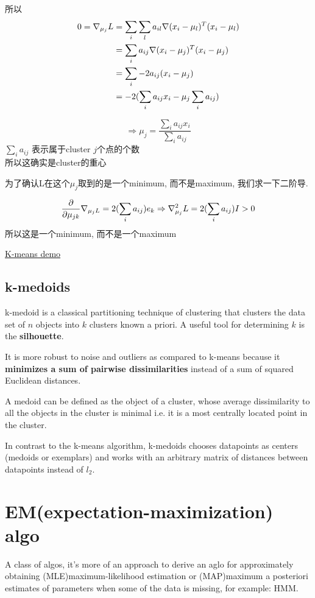 \documentclass{article}
\begin{document}
所以
$$
\begin{aligned}
0 = \nabla _{\mu_j}{L}
&= \sum_i \sum_l a_{il} \nabla (x_i - \mu_l)^T (x_i - \mu_l) \\
&= \sum_i a_{ij} \nabla (x_i - \mu_j)^T (x_i - \mu_j) \\
&= \sum_i -2a_{ij} (x_i - \mu_j) \\
&= -2(\sum_i a_{ij}x_i - \mu_j \sum_i a_{ij})
\end{aligned}
$$

$$
\Rightarrow
\mu_j = \dfrac{\sum_i a_{ij}x_i}{\sum_i a_{ij}}
$$
$\sum_i a_{ij}$  表示属于cluster $j$个点的个数\\
所以这确实是cluster的重心

为了确认L在这个$\mu_j$取到的是一个minimum, 而不是maximum, 我们求一下二阶导.

$$
\frac{\partial }{\partial \mu_{jk}} \nabla _{\mu_{j} L}
= 2(\sum_i a_{ij}) e_k
\Rightarrow
\nabla ^2_{\mu_j} L = 2(\sum_i a_{ij})I > 0
$$
所以这是一个minimum, 而不是一个maximum

\href{https://www.youtube.com/watch?v=zHbxbb2ye3E}{K-means demo}

\subsection{k-medoids}
k-medoid is a classical partitioning technique of clustering that clusters the data set of $n$ objects into $k$ clusters known a priori. 
A useful tool for determining $k$ is the \textbf{silhouette}.

It is more robust to noise and outliers as compared to k-means because it \textbf{minimizes a sum of pairwise dissimilarities} 
instead of a sum of squared Euclidean distances.

A medoid can be defined as the object of a cluster, whose average dissimilarity to all the objects in the cluster is minimal i.e. 
it is a most centrally located point in the cluster.

In contrast to the k-means algorithm, k-medoids chooses datapoints as centers (medoids or exemplars) and 
works with an arbitrary matrix of distances between datapoints instead of $l_2$.

\section{EM(expectation-maximization) algo}
A class of algos,
it's more of an approach to derive an aglo for approximately obtaining (MLE)maximum-likelihood estimation or 
(MAP)maximum a posteriori estimates of parameters when some of the data is missing, for example: HMM.
\end{document}
